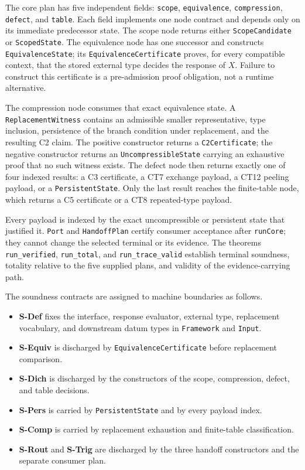 \documentclass[
  11pt,
]{article}
\providecommand{\tightlist}{%
  \setlength{\itemsep}{0pt}\setlength{\parskip}{0pt}}
\theoremstyle{definition}
\begin{document}
The core plan has five independent fields:
\texttt{scope}, \texttt{equivalence}, \texttt{compression}, \texttt{defect},
and \texttt{table}.  Each field implements one node contract and depends only
on its immediate predecessor state.  The scope node returns either
\texttt{ScopeCandidate} or \texttt{ScopedState}.  The equivalence node has one
successor and constructs \texttt{EquivalenceState}; its
\texttt{EquivalenceCertificate} proves, for every compatible context, that the
stored external type decides the response of \(X\).  Failure to construct this
certificate is a pre-admission proof obligation, not a runtime alternative.

The compression node consumes that exact equivalence state.  A
\texttt{ReplacementWitness} contains an admissible smaller representative,
type inclusion, persistence of the branch condition under replacement, and the
resulting C2 claim.  The positive constructor returns a
\texttt{C2Certificate}; the negative constructor returns an
\texttt{UncompressibleState} carrying an exhaustive proof that no such witness
exists.  The defect node then returns exactly one of four indexed results: a C3
certificate, a CT7 exchange payload, a CT12 peeling payload, or a
\texttt{PersistentState}.  Only the last result reaches the finite-table node,
which returns a C5 certificate or a CT8 repeated-type payload.

Every payload is indexed by the exact uncompressible or persistent state that
justified it.  \texttt{Port} and \texttt{HandoffPlan} certify consumer
acceptance after \texttt{runCore}; they cannot change the selected terminal or
its evidence.  The theorems \texttt{run\_verified}, \texttt{run\_total}, and
\texttt{run\_trace\_valid} establish terminal soundness, totality relative to
the five supplied plans, and validity of the evidence-carrying path.

The soundness contracts are assigned to machine boundaries as follows.
\begin{itemize}
\tightlist
\item \textbf{S-Def} fixes the interface, response evaluator, external type, replacement vocabulary, and downstream datum types in \texttt{Framework} and \texttt{Input}.
\item \textbf{S-Equiv} is discharged by \texttt{EquivalenceCertificate} before replacement comparison.
\item \textbf{S-Dich} is discharged by the constructors of the scope, compression, defect, and table decisions.
\item \textbf{S-Pers} is carried by \texttt{PersistentState} and by every payload index.
\item \textbf{S-Comp} is carried by replacement exhaustion and finite-table classification.
\item \textbf{S-Rout} and \textbf{S-Trig} are discharged by the three handoff constructors and the separate consumer plan.
\end{itemize}
\end{document}
